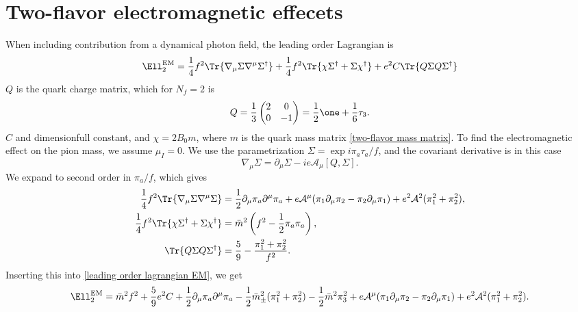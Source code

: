 \documentclass{book}
\begin{document}
\section{Two-flavor electromagnetic effecets}


When including contribution from a dynamical photon field, the leading order Lagrangian is~\autocite{eckerRoleResonancesChiral1989,urechVirtualPhotonsChiral1995}
%
\begin{equation}
    \label{leading order lagrangian EM}
    \Ell_2^{\text{EM}}
    = 
    \frac{1}{4}f^2 
    \Tr{
        \nabla_\mu \Sigma \nabla^\mu \Sigma^\dagger
    }
    +
    \frac{1}{4}f^2 
    \Tr{
        \chi \Sigma^\dagger + \Sigma\chi^\dagger
    }
    +
    e^2 C
    \Tr{Q \Sigma Q \Sigma^\dagger}
\end{equation}
%
$Q$ is the quark charge matrix, which for $N_f = 2$ is
%
\begin{equation}
    \label{two-flavor charge matrix}
    Q
    =
    \frac{1}{3} 
    \begin{pmatrix}
        2 & 0 \\
        0 & -1
    \end{pmatrix}
    = 
    \frac{1}{2} \one + \frac{1}{6} \tau_3.
\end{equation}
%
$C$ and dimensionfull constant, and $\chi = 2B_0 m$, where $m$ is the quark mass matrix \autoref{two-flavor mass matrix}.
To find the electromagnetic effect on the pion mass, we assume $\mu_I = 0$.
We use the parametrization $\Sigma = \exp{i \pi_a \tau_a / f}$, and the covariant derivative is in this case
%
\begin{equation}
    \nabla_\mu \Sigma = \partial_\mu \Sigma - i e \mathcal A_\mu [Q, \Sigma].
\end{equation}
%
We expand to second order in $\pi_a/f$, which gives
%
\begin{align}
    \frac{1}{4}f^2 \Tr{\nabla_\mu \Sigma \nabla^\mu \Sigma}
    &=
    \frac{1}{2}\partial_\mu \pi_a\partial^\mu \pi_a
    + e \mathcal A^\mu (\pi_1 \partial_\mu \pi_2 -\pi_2 \partial_\mu \pi_1)
    + e^2 \mathcal A^2 (\pi_1^2 + \pi_2^2), \\
    \frac{1}{4}f^2 \Tr{\chi \Sigma^\dagger + \Sigma \chi^\dagger}
    & = \bar m^2\left(f^2 - \frac{1}{2} \pi_a \pi_a\right), \\
    \Tr{Q \Sigma Q \Sigma^\dagger}
    & = \frac{5}{9} - \frac{\pi_1^2 + \pi_2^2}{f^2}.
\end{align}
%
Inserting this into \autoref{leading order lagrangian EM}, we get
%
\begin{equation}
    \Ell_2^\text{EM}
    = \bar m^2 f^2 + \frac{5}{9}e^2 C
    + \frac{1}{2}\partial_\mu \pi_a \partial^\mu \pi_a
    - \frac{1}{2} \bar m_\pm^2 (\pi_1^2 + \pi_2^2) 
    - \frac{1}{2}\bar m^2 \pi_3^2
    + e \mathcal A^\mu (\pi_1 \partial_\mu \pi_2 -\pi_2 \partial_\mu \pi_1)
    + e^2 \mathcal A^2 (\pi_1^2 + \pi_2^2).
\end{equation}
\end{document}
